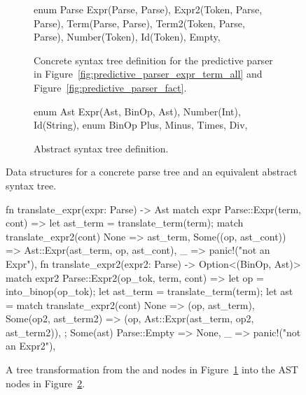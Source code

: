 \documentclass[
  oneside,
  english,
  coorientadorbanca,
  noabntexcite
]{ufsc-thesis-rn46-2019}
\newcommand{\code}[1]{\text{\scpfamily\setlength\spaceskip{0.35em}#1}}
\begin{document}
\begin{figure}[ht]
  \centering
  \begin{subfigure}[b]{0.45\textwidth}
    \begin{minipage}{\textwidth}
      \begin{rustcode}
enum Parse {
  Expr(Parse, Parse),
  Expr2(Token, Parse, Parse),
  Term(Parse, Parse),
  Term2(Token, Parse, Parse),
  Number(Token),
  Id(Token),
  Empty,
}
      \end{rustcode}
    \end{minipage}
    \caption{Concrete syntax tree definition for the predictive parser in Figure~\ref{fig:predictive_parser_expr_term_all} and Figure~\ref{fig:predictive_parser_fact}.}\label{fig:abstract_syntax_adt_a}
  \end{subfigure}
  \qquad
  \begin{subfigure}[b]{0.45\textwidth}
    \begin{minipage}{\textwidth}
      \begin{rustcode}
enum Ast {
  Expr(Ast, BinOp, Ast),
  Number(Int),
  Id(String),
}
enum BinOp {
  Plus,
  Minus,
  Times,
  Div,
}
      \end{rustcode}
    \end{minipage}
    \caption{
      Abstract syntax tree definition.
    }\label{fig:abstract_syntax_adt_b}
  \end{subfigure}
  \caption{
    Data structures for a concrete parse tree and an equivalent abstract syntax tree.
  }\label{fig:abstract_syntax_adt}
\end{figure}

\begin{figure}[ht]
  \centering
  \begin{minipage}{0.9\textwidth}
    \begin{rustcode}
fn translate_expr(expr: Parse) -> Ast {
  match expr {
    Parse::Expr(term, cont) => {
      let ast_term = translate_term(term);
      match translate_expr2(cont) {
        None => ast_term,
        Some((op, ast_cont)) => Ast::Expr(ast_term, op, ast_cont),
      }
    }
    _ => panic!("not an Expr"),
  }
}
fn translate_expr2(expr2: Parse) -> Option<(BinOp, Ast)> {
  match expr2 {
    Parse::Expr2(op_tok, term, cont) => {
      let op = into_binop(op_tok);
      let ast_term = translate_term(term);
      let ast = match translate_expr2(cont) {
        None => (op, ast_term),
        Some(op2, ast_term2) => (op, Ast::Expr(ast_term, op2, ast_term2)),
      };
      Some(ast)
    }
    Parse::Empty => None,
    _ => panic!("not an Expr2"),
  }
}
    \end{rustcode}
  \end{minipage}
  \caption{
    A tree transformation from the \code{Expr} and \code{Expr2} nodes in Figure~\ref{fig:abstract_syntax_adt_a} into the AST nodes in Figure~\ref{fig:abstract_syntax_adt_b}.
  }\label{fig:cst_ast_translator_expr}
\end{figure}
\end{document}
